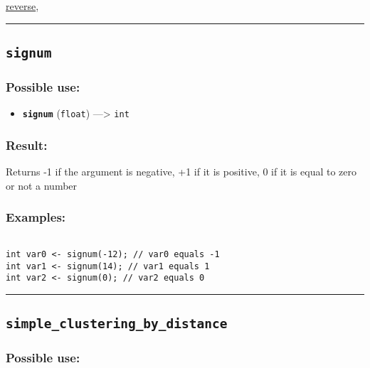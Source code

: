 \documentclass[]{book}
\providecommand{\tightlist}{%
  \setlength{\itemsep}{0pt}\setlength{\parskip}{0pt}}
\theoremstyle{definition}
\theoremstyle{definition}
\theoremstyle{definition}
\theoremstyle{remark}
\begin{document}
\href{OperatorsNR\#reverse}{reverse},

\begin{center}\rule{0.5\linewidth}{\linethickness}\end{center}

\subsection{\texorpdfstring{\texttt{signum}}{signum}}\label{signum}

\subsubsection{Possible use:}\label{possible-use-472}

\begin{itemize}
\tightlist
\item
  \textbf{\texttt{signum}} (\texttt{float}) ---\textgreater{}
  \texttt{int}
\end{itemize}

\subsubsection{Result:}\label{result-456}

Returns -1 if the argument is negative, +1 if it is positive, 0 if it is
equal to zero or not a number

\subsubsection{Examples:}\label{examples-328}

\begin{verbatim}
 
int var0 <- signum(-12); // var0 equals -1 
int var1 <- signum(14); // var1 equals 1 
int var2 <- signum(0); // var2 equals 0
\end{verbatim}

\begin{center}\rule{0.5\linewidth}{\linethickness}\end{center}

\subsection{\texorpdfstring{\texttt{simple\_clustering\_by\_distance}}{simple\_clustering\_by\_distance}}\label{simple_clustering_by_distance}

\subsubsection{Possible use:}\label{possible-use-473}
\end{document}
